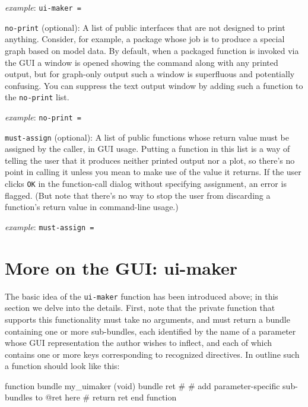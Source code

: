\documentclass[oneside]{book}
\newcommand{\ttusage}[1]{\textit{example}: \quad \texttt{#1}}
\begin{document}
\begin{description}
  \ttusage{ui-maker = }

\item \texttt{no-print} (optional): A list of public interfaces that
  are not designed to print anything.  Consider, for example, a
  package whose job is to produce a special graph based on model data.
  By default, when a packaged function is invoked via the GUI a window
  is opened showing the command along with any printed output, but for
  graph-only output such a window is superfluous and potentially
  confusing. You can suppress the text output window by adding such a
  function to the \texttt{no-print} list.

  \ttusage{no-print = }

\item \texttt{must-assign} (optional): A list of public functions whose
  return value must be assigned by the caller, in GUI usage.  Putting a
  function in this list is a way of telling the user that it produces
  neither printed output nor a plot, so there's no point in calling it
  unless you mean to make use of the value it returns. If the user
  clicks \texttt{OK} in the function-call dialog without specifying
  assignment, an error is flagged. (But note that there's no way to stop
  the user from discarding a function's return value in command-line
  usage.)

  \ttusage{must-assign = }

\end{description}

\section{More on the GUI: ui-maker}
\label{sec:ui-maker}

The basic idea of the \texttt{ui-maker} function has been introduced
above; in this section we delve into the details.  First, note that
the private function that supports this functionality must take no
arguments, and must return a bundle containing one or more
sub-bundles, each identified by the name of a parameter whose GUI
representation the author wishes to inflect, and each of which
contains one or more keys corresponding to recognized directives. In
outline such a function should look like this:

\begin{code}
function bundle my_uimaker (void)
    bundle ret
    #
    # add parameter-specific sub-bundles to @ret here
    #
    return ret
end function
\end{code}
\end{document}

